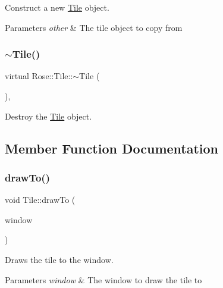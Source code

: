 Construct a new \mbox{\hyperlink{classRose_1_1Tile}{Tile}} object. 


\begin{DoxyParams}{Parameters}
{\em other} & The tile object to copy from \\
\hline
\end{DoxyParams}
\mbox{\label{classRose_1_1Tile_a793bce7c8764240826df99058f7d8f32}} 
\subsubsection{\texorpdfstring{$\sim$Tile()}{~Tile()}}
{\footnotesize\ttfamily virtual Rose\+::\+Tile\+::$\sim$\+Tile (\begin{DoxyParamCaption}{ }\end{DoxyParamCaption})\hspace{0.3cm}{\ttfamily [virtual]}, {\ttfamily [default]}}



Destroy the \mbox{\hyperlink{classRose_1_1Tile}{Tile}} object. 



\subsection{Member Function Documentation}
\mbox{\label{classRose_1_1Tile_ab83f64c1d7fdeba49f9d84bd1a33e612}} 
\subsubsection{\texorpdfstring{drawTo()}{drawTo()}}
{\footnotesize\ttfamily void Tile\+::draw\+To (\begin{DoxyParamCaption}\item[{sf\+::\+Render\+Window \&}]{window }\end{DoxyParamCaption})\hspace{0.3cm}{\ttfamily [virtual]}}



Draws the tile to the window. 


\begin{DoxyParams}{Parameters}
{\em window} & The window to draw the tile to \\
\hline
\end{DoxyParams}
\mbox{\label{classRose_1_1Tile_a93878ba24748c81017215d97efd1a2f0}} 
